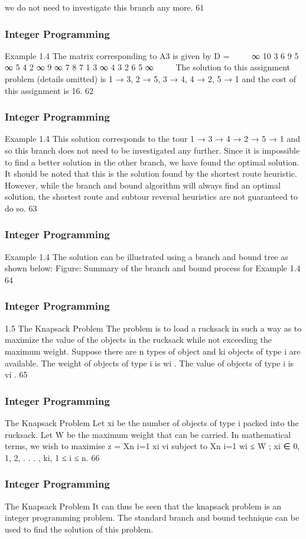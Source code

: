 \begin{frame}
we do not need to investigate this branch any more.
61 \end{frame}  \begin{frame} \frametitle{Integer Programming}     
Example 1.4
The matrix corresponding to A3 is given by
D =


∞ 10 3 6 9
5 ∞ 5 4 2
∞ 9 ∞ 7 8
7 1 3 ∞ 4
3 2 6 5 ∞


The solution to this assignment problem (details omitted) is 1 → 3,
2 → 5, 3 → 4, 4 → 2, 5 → 1 and the cost of this assignment is 16.
62 \end{frame}  \begin{frame} \frametitle{Integer Programming}     
Example 1.4
This solution corresponds to the tour 1 → 3 → 4 → 2 → 5 → 1
and so this branch does not need to be investigated any further.
Since it is impossible to find a better solution in the other branch,
we have found the optimal solution.
It should be noted that this is the solution found by the shortest
route heuristic. However, while the branch and bound algorithm
will always find an optimal solution, the shortest route and subtour
reversal heuristics are not guaranteed to do so.
63 \end{frame}  \begin{frame} \frametitle{Integer Programming}     
Example 1.4
The solution can be illustrated using a branch and bound tree as
shown below:
Figure: Summary of the branch and bound process for Example 1.4
64 \end{frame}  \begin{frame} \frametitle{Integer Programming}     
1.5 The Knapsack Problem
The problem is to load a rucksack in such a way as to maximize
the value of the objects in the rucksack while not exceeding the
maximum weight.
Suppose there are n types of object and ki objects of type i are
available.
The weight of objects of type i is wi
.
The value of objects of type i is vi
.
65 \end{frame}  \begin{frame} \frametitle{Integer Programming}     
The Knapsack Problem
Let xi be the number of objects of type i packed into the rucksack.
Let W be the maximum weight that can be carried.
In mathematical terms, we wish to maximise
z =
Xn
i=1
xi vi
subject to
Xn
i=1
wi ≤ W ; xi ∈ {0, 1, 2, . . . , ki}, 1 ≤ i ≤ n.
66 \end{frame}  \begin{frame} \frametitle{Integer Programming}     
The Knapsack Problem
It can thus be seen that the knapsack problem is an integer
programming problem.
The standard branch and bound technique can be used to find the
solution of this problem.

\end{frame}
